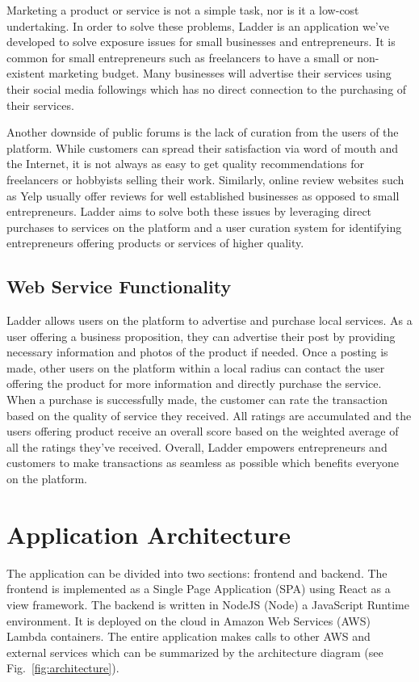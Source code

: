 \documentclass[conference]{IEEEtran}
\begin{document}
Marketing a product or service is not a simple task, nor is it a low-cost undertaking. In order to solve these problems, Ladder is an application we've developed to solve exposure issues for small businesses and entrepreneurs. It is common for small entrepreneurs such as freelancers to have a small or non-existent marketing budget. Many businesses will advertise their services using their social media followings which has no direct connection to the purchasing of their services.

Another downside of public forums is the lack of curation from the users of the platform. While customers can spread their satisfaction via word of mouth and the Internet, it is not always as easy to get quality recommendations for freelancers or hobbyists selling their work. Similarly, online review websites such as Yelp usually offer reviews for well established businesses as opposed to small entrepreneurs. Ladder aims to solve both these issues by leveraging direct purchases to services on the platform and a user curation system for identifying entrepreneurs offering products or services of higher quality.

\subsection{Web Service Functionality}
Ladder allows users on the platform to advertise and purchase local services. As a user offering a business proposition, they can advertise their post by providing necessary information and photos of the product if needed. Once a posting is made, other users on the platform within a local radius can contact the user offering the product for more information and directly purchase the service. When a purchase is successfully made, the customer can rate the transaction based on the quality of service they received. All ratings are accumulated and the users offering product receive an overall score based on the weighted average of all the ratings they've received. Overall, Ladder empowers entrepreneurs and customers to make transactions as seamless as possible which benefits everyone on the platform.

\section{Application Architecture}
The application can be divided into two sections: frontend and backend. The frontend is implemented as a Single Page Application (SPA) using React as a view framework. The backend is written in NodeJS (Node) a JavaScript Runtime environment. It is deployed on the cloud in Amazon Web Services (AWS) Lambda containers. The entire application makes calls to other AWS and external services which can be summarized by the architecture diagram (see Fig.~\ref{fig:architecture}).
\end{document}
